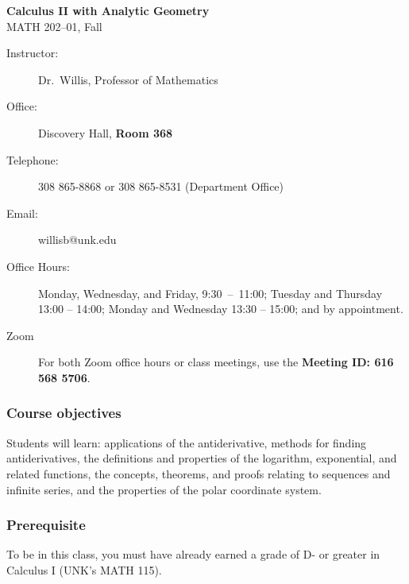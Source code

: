 \documentclass[12pt,fullpage]{article}
\newcounter{ex}\setcounter{ex}{0}
\newcommand{\term}{Fall }
\begin{document}
\large
\begin{center}
    \textbf{Calculus II with Analytic Geometry}  \\
    {MATH 202--01,  \term \the\year} \\
\end{center}

\vskip0.25in
\normalsize

\begin{center}
\begin{description}
    \item[Instructor:] Dr.\  Willis, Professor of Mathematics
    \item[Office:]  Discovery Hall,  \textbf{ Room 368}
    \item[Telephone:] 308 865-8868 or 308 865-8531 (Department Office)
   \item[Email:] willisb@unk.edu
   \item[Office Hours:] Monday, Wednesday, and  Friday, \mbox{9:30 -- 11:00}; Tuesday and Thursday 13:00 -- 14:00; Monday and Wednesday 13:30 -- 15:00;  and by appointment.

 \item[Zoom] For both Zoom office hours or class meetings, use the \textbf{Meeting ID: 616 568 5706}.
 \end{description}
\end{center}








\subsubsection*{Course objectives}


Students will learn: applications of the antiderivative, methods for finding antiderivatives, the definitions and properties of the logarithm, exponential, and related functions,
the concepts, theorems, and proofs relating to sequences and infinite series, and the properties of the polar coordinate system.


\subsubsection*{Prerequisite}

To be in this class, you must have already earned a grade of D- or  greater  in  Calculus I (UNK's MATH 115).
\end{document}
